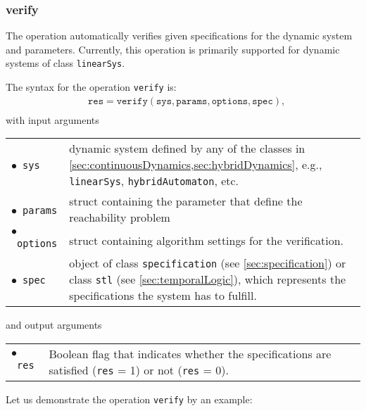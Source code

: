 \subsubsection{verify} \label{sec:verify}

The operation  automatically verifies given specifications for the dynamic system and parameters.
Currently, this operation is primarily supported for dynamic systems of class \texttt{linearSys}.

The syntax for the operation \texttt{verify} is:
\begin{equation*}
\begin{split}
	& \texttt{res} = \texttt{verify}(\texttt{sys},\texttt{params},\texttt{options},\texttt{spec}), \\
\end{split}
\end{equation*}
with input arguments

\begin{center}
\renewcommand{\arraystretch}{1.3}
\begin{tabular}[t]{l p{13cm} }
	$\bullet$~\texttt{sys} & dynamic system defined by any of the classes in \cref{sec:continuousDynamics,sec:hybridDynamics}, e.g., \texttt{linearSys}, \texttt{hybridAutomaton}, etc. \\
	$\bullet$~\texttt{params} & struct containing the parameter that define the reachability problem \\
	$\bullet$~\texttt{options} & struct containing algorithm settings for the verification. \\
	$\bullet$~\texttt{spec} & object of class \texttt{specification} (see \cref{sec:specification}) or class \texttt{stl} (see \cref{sec:temporalLogic}), which represents the specifications the system has to fulfill.
\end{tabular}
\end{center}

and output arguments

\begin{center}
\renewcommand{\arraystretch}{1.3}
\begin{tabular}[t]{l p{13cm} }
	$\bullet$~\texttt{res} & Boolean flag that indicates whether the specifications are satisfied (\texttt{res} = 1) or not (\texttt{res} = 0).
\end{tabular}
\end{center}

Let us demonstrate the operation \texttt{verify} by an example:

\begin{center}
\begin{minipage}[t]{0.6\textwidth}
	\footnotesize
	
\end{minipage}
\end{center}
